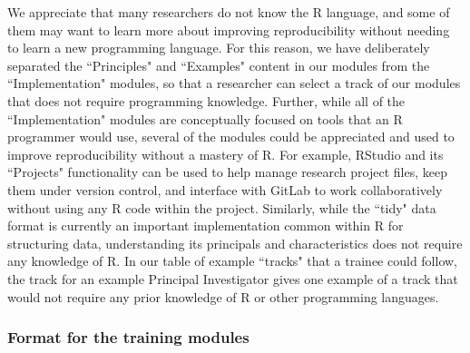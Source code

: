 \documentclass[pdftex,english,11pt,parskip=half]{scrartcl}
\begin{document}
We appreciate that many researchers do not know the R language, and
some of them may want to learn more about improving reproducibility without
needing to learn a new programming language. For this reason, we have
deliberately separated the ``Principles" and ``Examples" content in our modules
from the ``Implementation" modules, so that a researcher can select a track of
our modules that does not require programming knowledge. Further, while all of
the ``Implementation" modules are conceptually focused on tools that an R
programmer would use, several of the modules could be appreciated and used to
improve reproducibility without a mastery of R. For example, RStudio and its
``Projects" functionality can be used to help manage research project files,
keep them under version control, and interface with GitLab to work
collaboratively without using any R code within the project. Similarly, while
the ``tidy" data format is currently an important implementation common within R
for structuring data, understanding its principals and characteristics does not
require any knowledge of R. In our table of example ``tracks" that a trainee
could follow, the track for an example Principal Investigator gives one example
of a track that would not require any prior knowledge of R or other programming
languages.   







\subsubsection*{Format for the training modules}
\end{document}
